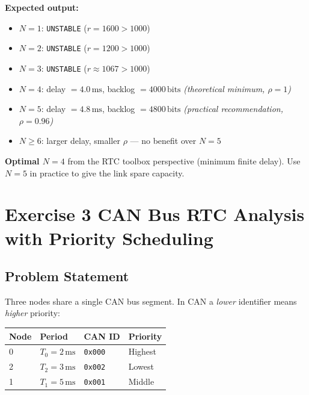 \documentclass[12pt, a4paper]{article}
\begin{document}
\begin{keybox}
  \textbf{Expected output:}
  \begin{itemize}[leftmargin=1.2em, itemsep=2pt]
    \item $N = 1$: \texttt{UNSTABLE} ($r = 1600 > 1000$)
    \item $N = 2$: \texttt{UNSTABLE} ($r = 1200 > 1000$)
    \item $N = 3$: \texttt{UNSTABLE} ($r \approx 1067 > 1000$)
    \item $N = 4$: delay $= 4.0\,\text{ms}$, backlog $= 4000\,\text{bits}$
      \quad\textit{(theoretical minimum, $\rho = 1$)}
    \item $N = 5$: delay $= 4.8\,\text{ms}$, backlog $= 4800\,\text{bits}$
      \quad\textit{(practical recommendation, $\rho = 0.96$)}
    \item $N \geq 6$: larger delay, smaller $\rho$ --- no benefit over $N=5$
  \end{itemize}
  \textbf{Optimal $N = 4$} from the RTC toolbox perspective (minimum finite delay).
  Use $N = 5$ in practice to give the link spare capacity.
\end{keybox}

\newpage
\section*{Exercise 3 \quad CAN Bus RTC Analysis with Priority Scheduling}

\subsection*{Problem Statement}

Three nodes share a single CAN bus segment.
In CAN a \emph{lower} identifier means \emph{higher} priority:

\begin{center}
\begin{tabular}{llll}
\toprule
Node & Period & CAN ID & Priority \\
\midrule
0 & $T_0 = 2\,\text{ms}$ & \texttt{0x000} & Highest \\
2 & $T_2 = 3\,\text{ms}$ & \texttt{0x002} & Lowest  \\
1 & $T_1 = 5\,\text{ms}$ & \texttt{0x001} & Middle  \\
\bottomrule
\end{tabular}
\end{center}
\end{document}

